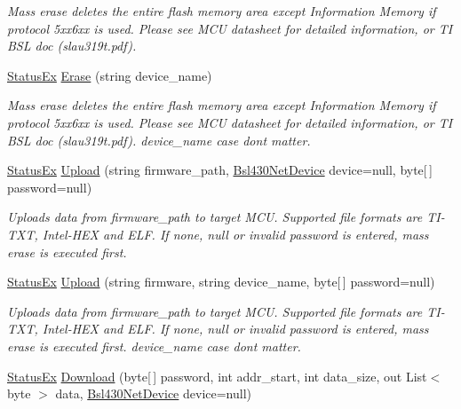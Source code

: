 \begin{DoxyCompactItemize}
\begin{DoxyCompactList}\small\item\em Mass erase deletes the entire flash memory area except Information Memory if protocol 5xx6xx is used. Please see M\+CU datasheet for detailed information, or TI B\+SL doc (slau319t.\+pdf). \end{DoxyCompactList}\item 
\mbox{\hyperlink{class_b_s_l430___n_e_t_1_1_status_ex}{Status\+Ex}} \mbox{\hyperlink{interface_b_s_l430___n_e_t_1_1_i_bsl430_net_a54980ac32c18ed1202db2c9ff4e38a7a}{Erase}} (string device\+\_\+name)
\begin{DoxyCompactList}\small\item\em Mass erase deletes the entire flash memory area except Information Memory if protocol 5xx6xx is used. Please see M\+CU datasheet for detailed information, or TI B\+SL doc (slau319t.\+pdf). device\+\_\+name case dont matter. \end{DoxyCompactList}\item 
\mbox{\hyperlink{class_b_s_l430___n_e_t_1_1_status_ex}{Status\+Ex}} \mbox{\hyperlink{interface_b_s_l430___n_e_t_1_1_i_bsl430_net_a598587fc08c2f9082b08abb65c058eaa}{Upload}} (string firmware\+\_\+path, \mbox{\hyperlink{class_b_s_l430___n_e_t_1_1_bsl430_net_device}{Bsl430\+Net\+Device}} device=null, byte\mbox{[}$\,$\mbox{]} password=null)
\begin{DoxyCompactList}\small\item\em Uploads data from firmware\+\_\+path to target M\+CU. Supported file formats are T\+I-\/\+T\+XT, Intel-\/\+H\+EX and E\+LF. If none, null or invalid password is entered, mass erase is executed first. \end{DoxyCompactList}\item 
\mbox{\hyperlink{class_b_s_l430___n_e_t_1_1_status_ex}{Status\+Ex}} \mbox{\hyperlink{interface_b_s_l430___n_e_t_1_1_i_bsl430_net_a3bc860bea764dd0ad0ee9c7a05fe4ecc}{Upload}} (string firmware, string device\+\_\+name, byte\mbox{[}$\,$\mbox{]} password=null)
\begin{DoxyCompactList}\small\item\em Uploads data from firmware\+\_\+path to target M\+CU. Supported file formats are T\+I-\/\+T\+XT, Intel-\/\+H\+EX and E\+LF. If none, null or invalid password is entered, mass erase is executed first. device\+\_\+name case dont matter. \end{DoxyCompactList}\item 
\mbox{\hyperlink{class_b_s_l430___n_e_t_1_1_status_ex}{Status\+Ex}} \mbox{\hyperlink{interface_b_s_l430___n_e_t_1_1_i_bsl430_net_abd3e49c1f00bfa2f42d58094e2ae3526}{Download}} (byte\mbox{[}$\,$\mbox{]} password, int addr\+\_\+start, int data\+\_\+size, out List$<$ byte $>$ data, \mbox{\hyperlink{class_b_s_l430___n_e_t_1_1_bsl430_net_device}{Bsl430\+Net\+Device}} device=null)

\end{DoxyCompactItemize}
